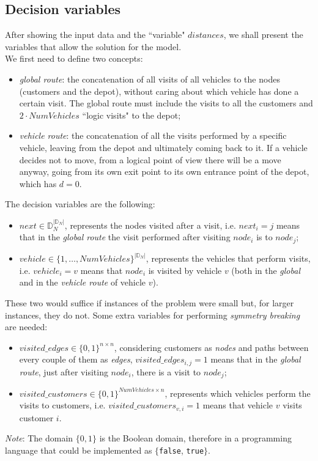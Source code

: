 \documentclass[../main.tex]{subfiles}
\begin{document}
\subsection{Decision variables}
After showing the input data and the ``variable" $distances$, we shall present the variables that allow the solution for the model.\\
We first need to define two concepts:
\begin{itemize}
    \item \textit{global route}: the concatenation of all visits of all vehicles to the nodes (customers and the depot), without caring about which vehicle has done a certain visit. The global route must include the visits to all the customers and $2 \cdot NumVehicles$ ``logic visits" to the depot;
    \item \textit{vehicle route}: the concatenation of all the visits performed by a specific vehicle, leaving from the depot and ultimately coming back to it. If a vehicle decides not to move, from a logical point of view there will be a move anyway, going from its own exit point to its own entrance point of the depot, which has $d = 0$.
\end{itemize}
The decision variables are the following:
\begin{itemize}
    \item $next \in \mathbb{D}_N^{|\mathbb{D}_N|}$, represents the nodes visited after a visit, i.e. $next_i = j$ means that in the \textit{global route} the visit performed after visiting $node_i$ is to $node_j$;
    \item $vehicle \in \{1,\dots,NumVehicles\}^{|\mathbb{D}_N|}$, represents the vehicles that perform visits, i.e. $vehicle_i = v$ means that $node_i$ is visited by vehicle $v$ (both in the \textit{global} and in the \textit{vehicle route} of vehicle $v$).
\end{itemize}
These two would suffice if instances of the problem were small but, for larger instances, they do not. Some extra variables for performing \textit{symmetry breaking} are needed:
\begin{itemize}
    \item $visited\_edges \in \{0,1\}^{n\times{}n}$, considering customers as \textit{nodes} and paths between every couple of them as \textit{edges}, $visited\_edges_{i,j} = 1$ means that in the \textit{global route}, just after visiting $node_i$, there is a visit to $node_j$;
    \item $visited\_customers \in \{0,1\}^{NumVehicles\times{}n}$, represents which vehicles perform the visits to customers, i.e. $visited\_customers_{v,i} = 1$ means that vehicle $v$ visits customer $i$.
\end{itemize}
\textit{Note}: The domain $\{0,1\}$ is the Boolean domain, therefore in a programming language that could be implemented as $\{$\texttt{false}, \texttt{true}$\}$.
\end{document}
